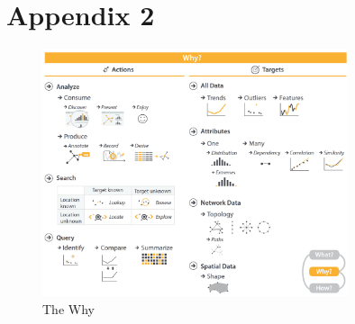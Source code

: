 \section{Appendix 2} \label{app:www-why}

\begin{figure}[h]
  \centering
  \includegraphics[width=0.8\textwidth]{Images/www/why.png}
  \caption{The Why}
  \label{fig:www-why}
\end{figure}

\newpage